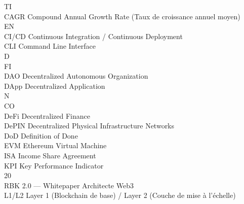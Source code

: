 \documentclass[12pt,landscape,a4paper]{article}
\begin{document}
\vspace{0.5em}
\vspace{0.5em}
TI\\
CAGR Compound Annual Growth Rate (Taux de croissance annuel moyen)\\
\vspace{0.5em}
\vspace{0.5em}
\vspace{0.5em}
\vspace{0.5em}
EN\\
CI/CD Continuous Integration / Continuous Deployment\\
\vspace{0.5em}
CLI Command Line Interface\\
\vspace{0.5em}
\vspace{0.5em}
\vspace{0.5em}
\vspace{0.5em}
D\\
FI\\
DAO Decentralized Autonomous Organization\\
\vspace{0.5em}
DApp Decentralized Application\\
N\\
CO\\
DeFi Decentralized Finance\\
\vspace{0.5em}
DePIN Decentralized Physical Infrastructure Networks\\
\vspace{0.5em}
DoD Definition of Done\\
\vspace{0.5em}
EVM Ethereum Virtual Machine\\
\vspace{0.5em}
ISA Income Share Agreement\\
\vspace{0.5em}
KPI Key Performance Indicator\\
\vspace{0.5em}
\vspace{0.5em}
\vspace{0.5em}
20\\
RBK 2.0 — Whitepaper Architecte Web3\\
\vspace{0.5em}
\vspace{0.5em}
L1/L2 Layer 1 (Blockchain de base) / Layer 2 (Couche de mise à l’échelle)\\
\vspace{0.5em}
\end{document}
